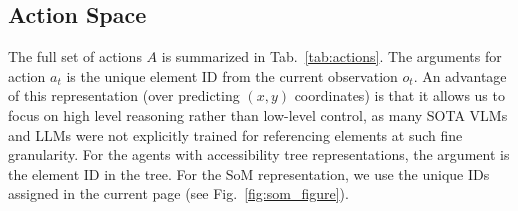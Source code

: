 \subsection{Action Space} \label{sec:action_space}
\begin{table} %
\vspace{-0.2in}
\centering
{}
\caption{Set of possible actions $A$.}   \label{tab:actions}
\end{table}

The full set of actions $A$ is summarized in Tab.~\ref{tab:actions}. 
The arguments for action $a_t$ is the unique element ID from the current observation $o_t$. 
An advantage of this representation (over predicting $(x, y)$ coordinates) is that it allows us to focus on high level reasoning rather than low-level control, as many SOTA VLMs and LLMs were not explicitly trained for referencing elements at such fine granularity.
For the agents with accessibility tree representations, the argument is the element ID in the tree. For the SoM representation, we use the unique IDs assigned in the current page (see Fig.~\ref{fig:som_figure}).


